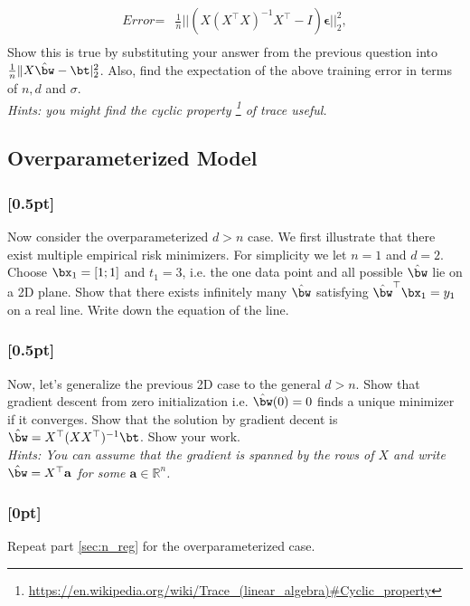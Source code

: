 \begin{align*}
     \textit{Error} = &\frac{1}{n} || (X(X^\top X)^{-1}X^\top - I)\boldsymbol{\epsilon} ||^2_2, \\
\end{align*}
Show this is true by substituting your answer from the previous question into $\frac{1}{n}\|X\hat{\bw}-\bt|_2^2$. Also, find the expectation of the above training error in terms of $n, d$ and $\sigma$. \\

\noindent \emph{Hints: you might find the cyclic property \footnote{\url{https://en.wikipedia.org/wiki/Trace_(linear_algebra)\#Cyclic_property}} of trace useful. }

\subsection{Overparameterized Model}

\subsubsection{{\color{blue}[0.5pt]} \LI}
Now consider the overparameterized $d>n$ case. We first illustrate that there exist multiple empirical risk minimizers.
For simplicity we let $n=1$ and $d=2$.
Choose $\bx_1 = [1;1]$ and $t_1 = 3$, i.e. the one data point and all possible $\hat{\bw}$ lie on a 2D plane.
Show that there exists infinitely many $\hat{\bw}$ satisfying $\hat{\bw}^\top\bx_1=y_1$ on a real line.
Write down the equation of the line.

\subsubsection{{\color{blue}[0.5pt]} \LIII\EC}

Now, let's generalize the previous 2D case to the general $d>n$. Show that gradient descent from zero initialization i.e. $\hat{\bw}(0) = 0$ finds a unique minimizer if it converges. Show that the solution by gradient decent is $\hat{\bw} = X^\top (XX^\top)^{-1}\bt$. Show your work. \\

\noindent \emph{Hints: You can assume that the gradient is spanned by the rows of $X$ and write $\hat{\bw} = X^\top \mathbf{a}$ for some $\mathbf{a}\in\mathbb{R}^n$.}

\subsubsection{{[0pt]} \LIII} 
Repeat part \ref{sec:n_reg} for the overparameterized case.

